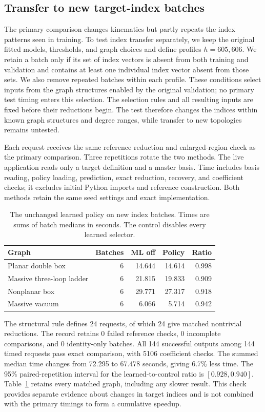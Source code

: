 \subsection{Transfer to new target-index batches}
The primary comparison changes kinematics but partly repeats the index patterns seen in training. To test index transfer separately, we keep the original fitted models, thresholds, and graph choices and define profiles $h=605,606$. We retain a batch only if its set of index vectors is absent from both training and validation and contains at least one individual index vector absent from those sets. We also remove repeated batches within each profile. These conditions select inputs from the graph structures enabled by the original validation; no primary test timing enters this selection. The selection rules and all resulting inputs are fixed before their reductions begin. The test therefore changes the indices within known graph structures and degree ranges, while transfer to new topologies remains untested.

Each request receives the same reference reduction and enlarged-region check as the primary comparison. Three repetitions rotate the two methods. The live application reads only a target definition and a master basis. Time includes basis reading, policy loading, prediction, exact reduction, recovery, and coefficient checks; it excludes initial Python imports and reference construction. Both methods retain the same seed settings and exact implementation.

\begin{table}[!htbp]\centering\small
\caption{The unchanged learned policy on new index batches. Times are sums of batch medians in seconds. The control disables every learned selector.}
\label{tab:index-transfer}
\begin{tabular}{@{}lrrrr@{}}\toprule
Graph & Batches & ML off & Policy & Ratio\\\midrule
Planar double box & 6 & 14.644 & 14.614 & 0.998\\
Massive three-loop ladder & 6 & 21.815 & 19.833 & 0.909\\
Nonplanar box & 6 & 29.771 & 27.317 & 0.918\\
Massive vacuum & 6 & 6.066 & 5.714 & 0.942\\
\bottomrule\end{tabular}
\end{table}

The structural rule defines 24 requests, of which 24 give matched nontrivial reductions. The record retains 0 failed reference checks, 0 incomplete comparisons, and 0 identity-only batches. All 144 successful outputs among 144 timed requests pass exact comparison, with 5106 coefficient checks. The summed median time changes from 72.295 to 67.478 seconds, giving 6.7\% less time. The 95\% paired-repetition interval for the learned-to-control ratio is $[0.928, 0.940]$. Table~\ref{tab:index-transfer} retains every matched graph, including any slower result. This check provides separate evidence about changes in target indices and is not combined with the primary timings to form a cumulative speedup.
